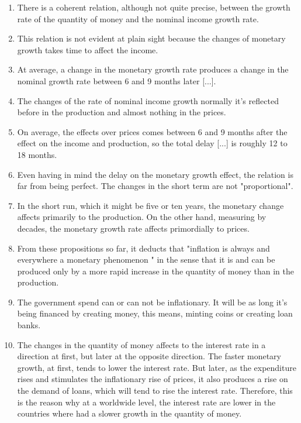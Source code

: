 \documentclass[12pt,a4paper,twoside]{book}
\begin{document}
\begin{itemize}
\begin{enumerate}
\item There is a coherent relation, although not quite precise, between the growth rate of the quantity of money and the nominal income growth rate.
\item This relation is not evident at plain sight because the changes of monetary growth takes time to affect the income.
\item At average, a change in the monetary growth rate produces a change in the nominal growth rate between 6 and 9 months later [...].
\item The changes of the rate of nominal income growth normally it's reflected before in the production and almost nothing in the prices.
\item On average, the effects over prices comes between 6 and 9 months after the effect on the income and production, so the total delay [...] is roughly 12 to 18 months.
\item Even having in mind the delay on the monetary growth effect, the relation is far from being perfect. The changes in the short term are not "proportional".
\item In the short run, which it might be five or ten years, the monetary change affects primarily to the production. On the other hand, measuring by decades, the monetary growth rate affects primordially to prices.
\item From these propositions so far, it deducts that "inflation is always and everywhere a monetary phenomenon " in the sense that it is and can be produced only by a more rapid increase in the quantity of money than in the production.
\item The government spend can or can not be inflationary. It will be as long it's being financed by creating money, this means, minting coins or creating loan banks. 
\item The changes in the quantity of money affects to the interest rate in a direction at first, but later at the opposite direction. The faster monetary growth, at first, tends to lower the interest rate. But later, as the expenditure rises and stimulates the inflationary rise of prices, it also produces a rise on the demand of loans, which will tend to rise the interest rate. Therefore, this is the reason why at a worldwide level, the interest rate are lower in the countries where had a slower growth in the quantity of money. \cite[pp. 37-38]{friedman:paro}
\end{enumerate}


\end{itemize}
\end{document}
